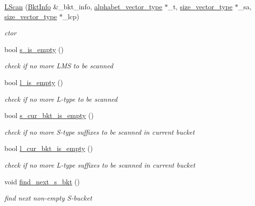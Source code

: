\begin{DoxyCompactItemize}
\item 
\hyperlink{struct_validate4_1_1_l_scan_a8e95d99392cee99b081b8354d9a13757}{L\+Scan} (\hyperlink{struct_validate4_1_1_bkt_info}{Bkt\+Info} \&\+\_\+bkt\+\_\+info, \hyperlink{class_validate4_a49c80b3d101be19542a4341c2387603a}{alphabet\+\_\+vector\+\_\+type} $\ast$\+\_\+t, \hyperlink{class_validate4_a46ea31a0a4b23f583806792160421d15}{size\+\_\+vector\+\_\+type} $\ast$\+\_\+sa, \hyperlink{class_validate4_a46ea31a0a4b23f583806792160421d15}{size\+\_\+vector\+\_\+type} $\ast$\+\_\+lcp)
\begin{DoxyCompactList}\small\item\em ctor \end{DoxyCompactList}\item 
bool \hyperlink{struct_validate4_1_1_l_scan_a071826b788f5aadc92f87ad8cc986649}{s\+\_\+is\+\_\+empty} ()
\begin{DoxyCompactList}\small\item\em check if no more L\+MS to be scanned \end{DoxyCompactList}\item 
bool \hyperlink{struct_validate4_1_1_l_scan_a22b7a0b8c64f17da5a815ddaf8619ebb}{l\+\_\+is\+\_\+empty} ()
\begin{DoxyCompactList}\small\item\em check if no more L-\/type to be scanned \end{DoxyCompactList}\item 
bool \hyperlink{struct_validate4_1_1_l_scan_a9331f92d91cf67c38a3d6948a2190df8}{s\+\_\+cur\+\_\+bkt\+\_\+is\+\_\+empty} ()
\begin{DoxyCompactList}\small\item\em check if no more S-\/type suffixes to be scanned in current bucket \end{DoxyCompactList}\item 
bool \hyperlink{struct_validate4_1_1_l_scan_ae76d58363b02ac96925becbbdbe02977}{l\+\_\+cur\+\_\+bkt\+\_\+is\+\_\+empty} ()
\begin{DoxyCompactList}\small\item\em check if no more L-\/type suffixes to be scanned in current bucket \end{DoxyCompactList}\item 
void \hyperlink{struct_validate4_1_1_l_scan_aa570a8ac447950b6b0d9deae2e4cae63}{find\+\_\+next\+\_\+s\+\_\+bkt} ()
\begin{DoxyCompactList}\small\item\em find next non-\/empty S-\/bucket \end{DoxyCompactList}\item 

\end{DoxyCompactItemize}
